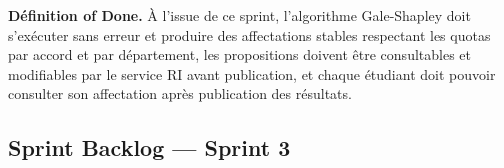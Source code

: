 \textbf{Définition of Done.} À l'issue de ce sprint, l'algorithme Gale-Shapley doit s'exécuter sans erreur et produire des affectations stables respectant les quotas par accord et par département, les propositions doivent être consultables et modifiables par le service RI avant publication, et chaque étudiant doit pouvoir consulter son affectation après publication des résultats.

\setcounter{tasknum}{1}

\newcommand{\usheaderorange}[2]{%
  \multicolumn{6}{|p{\uswidth}|}{%
    \cellcolor{orange!8}%
    \textbf{#1} — \small\textit{#2}%
  } \\ \hline
}

\subsection{Sprint Backlog — Sprint 3}

\begingroup
\footnotesize
\setlength{\tabcolsep}{3pt}
\renewcommand{\arraystretch}{1.6}

